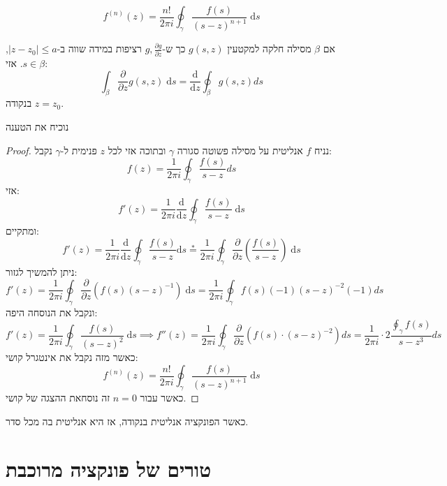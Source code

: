 \documentclass{tstextbook}
\begin{document}
\begin{proposition}
$$f^{(n)}(z)=\frac{n!}{2\pi i} \oint_{\gamma} \frac{f(s)}{(s-z)^{n+1}}\;\mathrm{d}s$$

\end{proposition}
\begin{lemma}
אם \(\beta\) מסילה חלקה למקטעין \(g(s,z)\) כך ש-\(g,\frac{\partial g}{\partial z}\) רציפות במידה שווה ב-\(\lvert z-z_{0} \rvert\leq a\), \(s \in \beta\). אזי:
$$\int_{\beta} \frac{\partial }{\partial z} g(s,z)\;\mathrm{d}s = \frac{\mathrm{d} }{\mathrm{d} z} \oint_{\beta}g(s,z)ds$$
בנקודה \(z=z_{0}\).

\end{lemma}
נוכיח את הטענה

\begin{proof}
נניח \(f\) אנליטית על מסילה פשוטה סגורה \(\gamma\) ובתוכה אזי לכל \(z\) פנימית ל-\(\gamma\) נקבל:
$$f(z)=\frac{1}{2\pi i}\oint_{\gamma} \frac{f(s)}{s-z}ds$$
אזי:
$$f'(z)=\frac{1}{2\pi i} \frac{\mathrm{d} }{\mathrm{d} z} \oint_{\gamma} \frac{f(s)}{s-z}\;\mathrm{d}s$$
ומתקיים:
$$f'(z)=\frac{1}{2\pi i}\frac{\mathrm{d} }{\mathrm{d} z} \oint_{\gamma}\frac{f(s)}{s-z}\mathrm{d}s\overset{*}{=} \frac{1}{2\pi i}\oint_{\gamma}\frac{\partial }{\partial z} \left( \frac{f(s)}{s-z} \right)\;\mathrm{d}s$$
ניתן להמשיך לגזור:
$$f'(z)=\frac{1}{2\pi i}\oint_{\gamma} \frac{\partial }{\partial z} (f(s)(s-z)^{-1})\;\mathrm{d}s = \frac{1}{2\pi i} \oint_{\gamma}f(s) (-1)(s-z)^{-2}(-1)ds$$
ונקבל את הנוסחה היפה:
$$f'(z)=\frac{1}{2\pi i}\oint_{\gamma} \frac{f(s)}{(s-z)^2}\;\mathrm{d}s \implies f''(z)=\frac{1}{2\pi i}\oint_{\gamma} \frac{\partial }{\partial z} \left( f(s)\cdot(s-z)^{-2} \right)ds=\frac{1}{2\pi i}\cdot 2 \frac{\oint_{\gamma}f(s)}{s-z^3}ds$$
כאשר מזה נקבל את אינטגרל קושי:
$$\boxed{f^{(n)}(z)=\frac{n!}{2\pi i} \oint_{\gamma} \frac{f(s)}{(s-z)^{n+1}}\;\mathrm{d}s}
$$
כאשר עבור \(n=0\) זה נוסחאת ההצגה של קושי.

\end{proof}
\begin{corollary}
כאשר הפונקציה אנליטית בנקודה, אז היא אנליטית בה מכל סדר.

\end{corollary}

\section{טורים של פונקציה מרוכבת}
\end{document}
